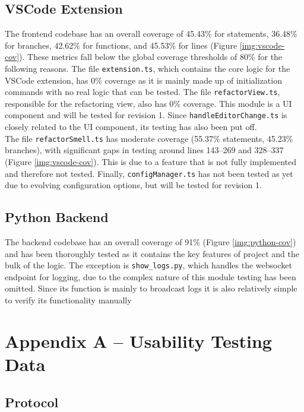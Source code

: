 \documentclass[12pt, titlepage]{article}
\begin{document}
\subsection{VSCode Extension}
The frontend codebase has an overall coverage of 45.43\% for
statements, 36.48\% for branches, 42.62\% for functions, and 45.53\%
for lines (Figure \ref{img:vscode-cov}). These metrics fall below the
global coverage thresholds of 80\% for the following reasons. The
file \texttt{extension.ts}, which contains the core logic for the
VSCode extension, has 0\% coverage as it is mainly made up of
initialization commands with no real logic that can be tested. The
file \texttt{refactorView.ts}, responsible for the refactoring view,
also has 0\% coverage. This module is a UI component and will be
tested for revision 1. Since \texttt{handleEditorChange.ts} is
closely related to the UI component, its testing has also been put off.\\

The file \texttt{refactorSmell.ts} has moderate coverage (55.37\%
statements, 45.23\% branches), with significant gaps in testing
around lines 143–269 and 328–337 (Figure \ref{img:vscode-cov}). This
is due to a feature that is not fully implemented and therefore not
tested. Finally, \texttt{configManager.ts} has not been tested as yet
due to evolving configuration options, but will be tested for revision 1.

\subsection{Python Backend}
The backend codebase has an overall coverage of 91\% (Figure
\ref{img:python-cov}) and has been thoroughly tested as it contains
the key features of project and the bulk of the logic. The exception
is \texttt{show\_logs.py}, which handles the websocket endpoint for
logging, due to the complex nature of this module testing has been
omitted. Since its function is mainly to broadcast logs it is also
relatively simple to verify its functionality manually\\

\newpage
\section*{Appendix A -- Usability Testing Data} \label{appendix:usability}

\subsection*{Protocol}
\end{document}
